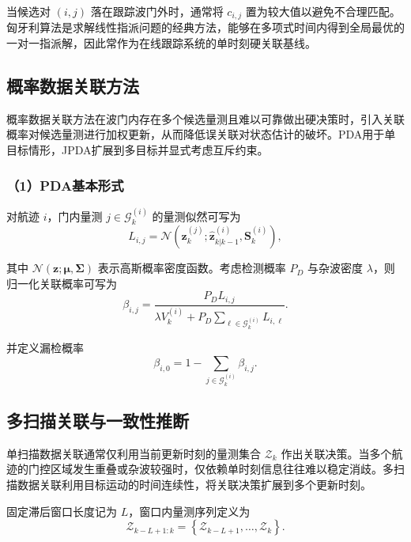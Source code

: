 \documentclass{xdupgthesis}
\begin{document}
当候选对 $(i,j)$ 落在跟踪波门外时，通常将 $c_{i,j}$ 置为较大值以避免不合理匹配。匈牙利算法是求解线性指派问题的经典方法，能够在多项式时间内得到全局最优的一对一指派解，因此常作为在线跟踪系统的单时刻硬关联基线。

\subsection{概率数据关联方法}

概率数据关联方法在波门内存在多个候选量测且难以可靠做出硬决策时，引入关联概率对候选量测进行加权更新，从而降低误关联对状态估计的破坏。PDA用于单目标情形，JPDA扩展到多目标并显式考虑互斥约束。

\subsubsection{（1）PDA基本形式}

对航迹 $i$，门内量测 $j\in\mathcal{G}^{(i)}_k$ 的量测似然可写为
\begin{equation}
	L_{i,j}
	=
	\mathcal{N}
	\!\left(
	\mathbf{z}^{(j)}_k;
	\hat{\mathbf{z}}^{(i)}_{k|k-1},
	\mathbf{S}^{(i)}_k
	\right),
\end{equation}

其中 $\mathcal{N}(\mathbf{z};\boldsymbol{\mu},\mathbf{\Sigma})$ 表示高斯概率密度函数。考虑检测概率 $P_D$ 与杂波密度 $\lambda$，则归一化关联概率可写为
\begin{equation}
	\beta_{i,j}
	=
	\frac{P_D L_{i,j}}
	{\lambda V_k^{(i)} + P_D \sum_{\ell\in\mathcal{G}^{(i)}_k}L_{i,\ell}} .
\end{equation}

并定义漏检概率
\begin{equation}
	\beta_{i,0}
	=
	1-\sum_{j\in\mathcal{G}^{(i)}_k}\beta_{i,j}.
\end{equation}

\subsection{多扫描关联与一致性推断}

单扫描数据关联通常仅利用当前更新时刻的量测集合 $\mathcal{Z}_k$ 作出关联决策。当多个航迹的门控区域发生重叠或杂波较强时，仅依赖单时刻信息往往难以稳定消歧。多扫描数据关联利用目标运动的时间连续性，将关联决策扩展到多个更新时刻。

固定滞后窗口长度记为 $L$，窗口内量测序列定义为
\begin{equation}
	\mathcal{Z}_{k-L+1:k}
	=
	\left\{
	\mathcal{Z}_{k-L+1},\ldots,\mathcal{Z}_k
	\right\}.
\end{equation}
\end{document}
